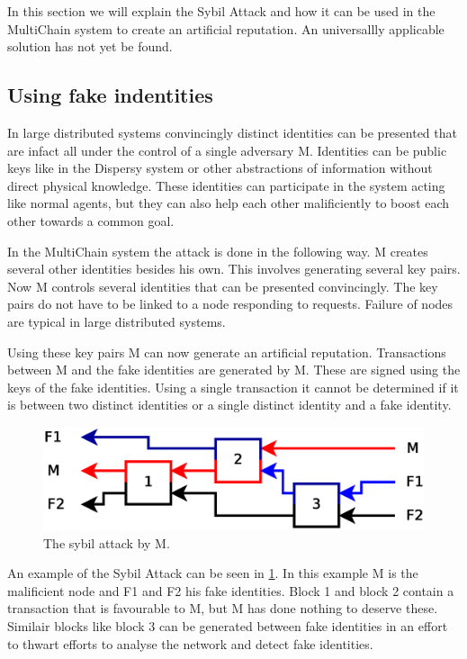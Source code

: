 In this section we will explain the Sybil Attack\cite{douceur-sybil}
and how it can be used in the MultiChain system to create an artificial reputation.
An universallly applicable solution has not yet be found\cite{levine-sybilsurvey}.

\subsection{Using fake indentities}
In large distributed systems convincingly distinct identities can be presented
that are infact all under the control of a single adversary M.
Identities can be public keys like in the Dispersy system
or other abstractions of information without direct physical knowledge.
These identities can participate in the system acting like normal agents,
but they can also help each other malificiently to boost each other towards a common goal.

In the MultiChain system the attack is done in the following way.
M creates several other identities besides his own.
This involves generating several key pairs.
Now M controls several identities that can be presented convincingly.
The key pairs do not have to be linked to a node responding to requests.
Failure of nodes are typical in large distributed systems.

Using these key pairs M can now generate an artificial reputation.
Transactions between M and the fake identities are generated by M.
These are signed using the keys of the fake identities.
Using a single transaction it cannot be determined if it is between two distinct identities or a single distinct identity and a fake identity.

\begin{figure}
	\centerline{\includegraphics[scale=0.3]{problems/figs/sybil.eps}}
	\caption{The sybil attack by M.}
	\label{fig:sybil-example}
\end{figure}

An example of the Sybil Attack can be seen in \ref{fig:sybil-example}.
In this example M is the malificient node and F1 and F2 his fake identities.
Block 1 and block 2 contain a transaction that is favourable to M,
but M has done nothing to deserve these.
Similair blocks like block 3 can be generated between fake identities in an effort to thwart efforts to analyse the network
and detect fake identities.

